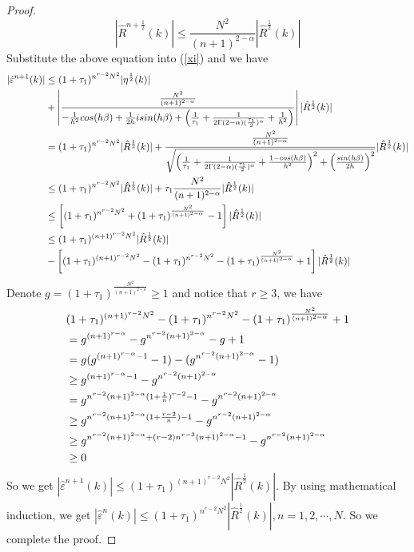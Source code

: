 \documentclass[10pt, reqno]{amsart}
\theoremstyle{remark}
\theoremstyle{definition}
\numberwithin{table}{section}
\begin{document}
\begin{proof}
$$
\left|\hat{R}^{n+\frac{1}{2}}(k)\right|\leq \frac{N^2}{(n+1)^{2-\alpha}}\left|\hat{R}^{\frac{1}{2}}(k)\right|
$$
Substitute the above equation into (\ref{xi}) and we have
\begin{align}
    |\hat{\varepsilon}^{n+1}(k)|&\leq (1+\tau_1)^{n^{r-2}N^{2}}|\eta^{\frac{1}{2}}(k)|\notag\\
    &+\left|\frac{\frac{N^2}{(n+1)^{2-\alpha}}}{-\frac{1}{h^2}cos(h\beta)+\frac{1}{2h}isin(h\beta)+\left(\frac{1}{\tau_{1}}+\frac{1}{2\Gamma(2-\alpha)(\frac{\tau_{1}}{2})^\alpha}+\frac{1}{h^2}\right)}\right||\hat{R}^{\frac{1}{2}}(k)|\notag\\
    &=(1+\tau_1)^{n^{r-2}N^{2}}|\hat{R}^{\frac{1}{2}}(k)|+\frac{\frac{N^2}{(n+1)^{2-\alpha}}}{\sqrt{\left( \frac{1}{\tau_1}+\frac{1}{2\Gamma(2-\alpha)(\frac{\tau_{1}}{2})^\alpha}+\frac{1-cos(h\beta)}{h^2}\right)^2+\left(\frac{sin(h\beta)}{2h}\right)^2}}|\hat{R}^{\frac{1}{2}}(k)|\notag\\
    &\leq (1+\tau_1)^{n^{r-2}N^{2}}|\hat{R}^{\frac{1}{2}}(k)|+\tau_1 \frac{N^2}{(n+1)^{2-\alpha}}|\hat{R}^{\frac{1}{2}}(k)|\notag\\
    &\leq \left[(1+\tau_1)^{n^{r-2}N^{2}}+(1+\tau_1)^{\frac{N^2}{(n+1)^{2-\alpha}}}-1\right]|\hat{R}^{\frac{1}{2}}(k)|\notag\\
    &\leq(1+\tau_1)^{(n+1)^{r-2}N^{2}}|\hat{R}^{\frac{1}{2}}(k)|\notag\\
    &- \left[(1+\tau_1)^{(n+1)^{r-2}N^{2}}-(1+\tau_1)^{n^{r-2}N^{2}}-(1+\tau_1)^{\frac{N^2}{(n+1)^{2-\alpha}}}+1\right]|\hat{R}^{\frac{1}{2}}(k)|\notag
\end{align}
Denote $g = (1+\tau_1)^{\frac{N^2}{(n+1)^{2-\alpha}}}\geq 1$ and notice that $r\geq 3$,  we have
\begin{align}
    &(1+\tau_1)^{(n+1)^{r-2}N^{2}}-(1+\tau_1)^{n^{r-2}N^{2}}-(1+\tau_1)^{\frac{N^2}{(n+1)^{2-\alpha}}}+1\notag\\
    &= g^{(n+1)^{r-\alpha}}-g^{n^{r-2}(n+1)^{2-\alpha}}-g+1\notag\\
    &=g(g^{(n+1)^{r-\alpha}-1}-1)-(g^{n^{r-2}(n+1)^{2-\alpha}}-1)\notag\\
    &\geq g^{(n+1)^{r-\alpha}-1}-g^{n^{r-2}(n+1)^{2-\alpha}}\notag\\
    &= g^{n^{r-2}(n+1)^{2-\alpha}(1+\frac{1}{n})^{r-2}-1}-g^{n^{r-2}(n+1)^{2-\alpha}}\notag\\
    &\geq g^{n^{r-2}(n+1)^{2-\alpha}(1+\frac{r-2}{n})-1}-g^{n^{r-2}(n+1)^{2-\alpha}}\notag\\
    &\geq g^{n^{r-2}(n+1)^{2-\alpha}+(r-2)n^{r-3}(n+1)^{2-\alpha}-1}-g^{n^{r-2}(n+1)^{2-\alpha}}\notag\\
    &\geq 0 \notag
\end{align}
So we get $|\hat{\varepsilon}^{n+1}(k)|\leq (1+\tau_1)^{(n+1)^{r-2}N^{2}}\left|\hat{R}^{\frac{1}{2}}(k)\right|$. By using mathematical induction,  we get $|\hat{\varepsilon}^n(k)|\leq (1+\tau_1)^{n^{r-2}N^{2}}|\hat{R}^{\frac{1}{2}}(k)|, n=1, 2, \cdots, N$. So we complete the proof. 
\end{proof}
\end{document}
